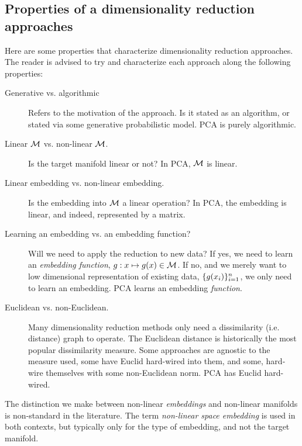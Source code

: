 \documentclass[12pt,a4paper]{article}
\begin{document}
\subsection{Properties of a dimensionality reduction approaches}
Here are some properties that characterize dimensionality reduction approaches. 
The reader is advised to try and characterize each approach along the following properties:
\begin{description}
	\item [Generative vs. algorithmic] Refers to the motivation of the approach. Is it stated as an algorithm, or stated via some generative probabilistic model. 
	PCA is purely algorithmic. 

	\item [Linear $\mathcal{M}$ vs. non-linear $\mathcal{M}$.]
	Is the target manifold linear or not?
	In PCA, $\mathcal{M}$ is linear.

	\item [Linear embedding vs. non-linear embedding.] 
	Is the embedding into $\mathcal{M}$ a linear operation?
	In PCA, the embedding is linear, and indeed, represented by a matrix. 
	
	\item [Learning an embedding vs. an embedding function?]
	Will we need to apply the reduction to new data? 
	If yes, we need to learn an \emph{embedding function}, $g:x \mapsto g(x)\in \mathcal{M}$.
	If no, and we merely want to low dimensional representation of existing data, $\{ g(x_i) \}_{i=1}^n$, we only need to learn an embedding. 
	PCA learns an embedding \emph{function}.
	
	\item [Euclidean vs. non-Euclidean.] 
	Many dimensionality reduction methods only need a dissimilarity (i.e. distance) graph to operate. 
	The Euclidean distance is historically the most popular dissimilarity measure.
	Some approaches are agnostic to the measure used, some have Euclid hard-wired into them, and some, hard-wire themselves with some non-Euclidean norm. 
	PCA has Euclid hard-wired. 
\end{description}

\begin{remark}
	The distinction we make between non-linear \emph{embeddings} and non-linear manifolds is non-standard in the literature. 
	The term \emph{non-linear space embedding} is used in both contexts, but typically only for the type of embedding, and not the target manifold.
\end{remark}
\end{document}
